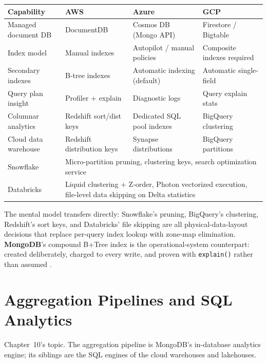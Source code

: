 \begin{center}
\footnotesize
\begin{tabular}{@{}p{2.9cm}p{3.0cm}p{3.0cm}p{3.0cm}@{}}
\toprule
\textbf{Capability} & \textbf{AWS} & \textbf{Azure} & \textbf{GCP} \\
\midrule
Managed document DB & DocumentDB & Cosmos DB (Mongo API) & Firestore / Bigtable \\
Index model & Manual indexes & Autopilot / manual policies & Composite indexes required \\
Secondary indexes & B-tree indexes & Automatic indexing (default) & Automatic single-field \\
Query plan insight & Profiler + explain & Diagnostic logs & Query explain stats \\
Columnar analytics & Redshift sort/dist keys & Dedicated SQL pool indexes & BigQuery clustering \\
Cloud data warehouse & Redshift distribution keys & Synapse distributions & BigQuery partitions \\
\addlinespace
Snowflake & \multicolumn{3}{l}{Micro-partition pruning, clustering keys, search optimization service} \\
Databricks & \multicolumn{3}{l}{Liquid clustering + Z-order, Photon vectorized execution, file-level data skipping on Delta statistics} \\
\bottomrule
\end{tabular}
\end{center}

\noindent The mental model transfers directly: Snowflake's pruning, BigQuery's clustering,
Redshift's sort keys, and Databricks' file skipping are all physical-data-layout decisions that
replace per-query index lookup with zone-map elimination. \textbf{MongoDB}'s compound B+Tree index
is the operational-system counterpart: created deliberately, charged to every write, and proven
with \texttt{explain()} rather than assumed \cite{mongodbIndexesDocs,mongodbExplainDocs}.

\section{Aggregation Pipelines and SQL Analytics}
%
Chapter~10's topic. The aggregation pipeline is MongoDB's in-database analytics engine; its
siblings are the SQL engines of the cloud warehouses and lakehouses.

